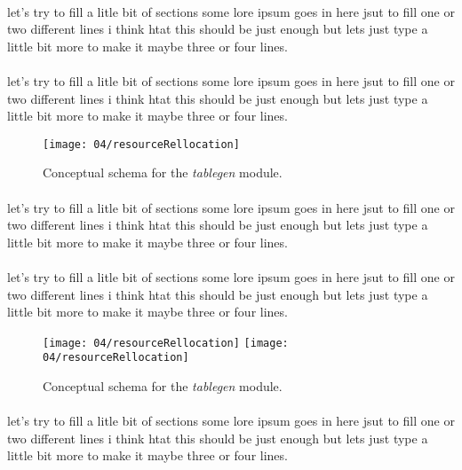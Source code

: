 \paragraph{}
let's try to fill a litle bit of sections some lore ipsum goes in here jsut to fill one or two different lines i think htat this should be just enough but lets just type a little bit more to make it maybe three or four lines.

\paragraph{}
let's try to fill a litle bit of sections some lore ipsum goes in here jsut to fill one or two different lines i think htat this should be just enough but lets just type a little bit more to make it maybe three or four lines.

\begin{figure}
        \texttt{[image: 04/resourceRellocation]}
        \centering
        \caption{Conceptual schema for the \emph{tablegen} module.}
\end{figure}

\paragraph{}
let's try to fill a litle bit of sections some lore ipsum goes in here jsut to fill one or two different lines i think htat this should be just enough but lets just type a little bit more to make it maybe three or four lines.

\paragraph{}
let's try to fill a litle bit of sections some lore ipsum goes in here jsut to fill one or two different lines i think htat this should be just enough but lets just type a little bit more to make it maybe three or four lines.

\begin{figure}
        \texttt{[image: 04/resourceRellocation]}
        \texttt{[image: 04/resourceRellocation]}
        \centering
        \caption{Conceptual schema for the \emph{tablegen} module.}
\end{figure}

\paragraph{}
let's try to fill a litle bit of sections some lore ipsum goes in here jsut to fill one or two different lines i think htat this should be just enough but lets just type a little bit more to make it maybe three or four lines.


